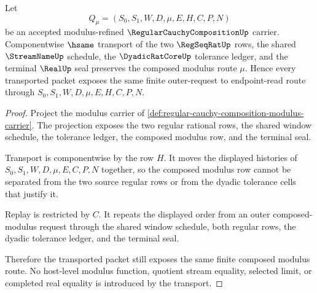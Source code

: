 \begin{theorem}\label{thm:regular-cauchy-composition-modulus-stability}
Let
$$
Q_\mu=(S_0,S_1,W,D,\mu,E,H,C,P,N)
$$
be an accepted modulus-refined $\RegularCauchyCompositionUp$ carrier. Componentwise $\hsame$ transport of the two $\RegSeqRatUp$ rows, the shared $\StreamNameUp$ schedule, the $\DyadicRatCoreUp$ tolerance ledger, and the terminal $\RealUp$ seal preserves the composed modulus route $\mu$. Hence every transported packet exposes the same finite outer-request to endpoint-read route through $S_0,S_1,W,D,\mu,E,H,C,P,N$.
\end{theorem}
\begin{proof}
Project the modulus carrier of \autoref{def:regular-cauchy-composition-modulus-carrier}. The projection exposes the two regular rational rows, the shared window schedule, the tolerance ledger, the composed modulus row, and the terminal seal.

Transport is componentwise by the row $H$. It moves the displayed histories of $S_0,S_1,W,D,\mu,E,C,P,N$ together, so the composed modulus row cannot be separated from the two source regular rows or from the dyadic tolerance cells that justify it.

Replay is restricted by $C$. It repeats the displayed order from an outer composed-modulus request through the shared window schedule, both regular rows, the dyadic tolerance ledger, and the terminal seal.

Therefore the transported packet still exposes the same finite composed modulus route. No host-level modulus function, quotient stream equality, selected limit, or completed real equality is introduced by the transport.
\end{proof}

